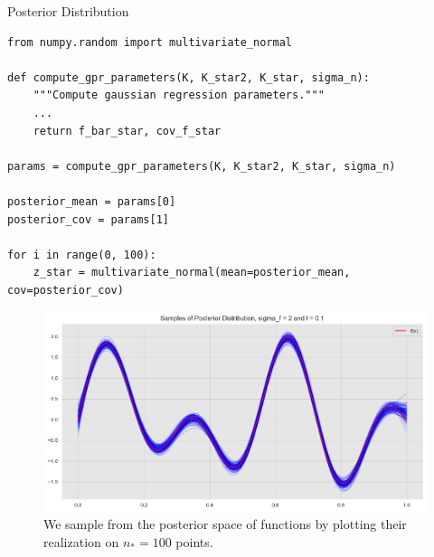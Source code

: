 \documentclass[10pt]{beamer}
\begin{document}
\begin{frame}[fragile]{Posterior Distribution}
\begin{lstlisting}
from numpy.random import multivariate_normal

def compute_gpr_parameters(K, K_star2, K_star, sigma_n):
    """Compute gaussian regression parameters."""
    ...
    return f_bar_star, cov_f_star

params = compute_gpr_parameters(K, K_star2, K_star, sigma_n)

posterior_mean = params[0]
posterior_cov = params[1]

for i in range(0, 100):
    z_star = multivariate_normal(mean=posterior_mean, cov=posterior_cov)
\end{lstlisting}
\begin{center}
\begin{figure}
\includegraphics[scale=0.23]{images/gaussian_process_regression_files/gaussian_process_regression_57_0.png} 
\caption{We sample from the posterior space of functions by plotting their realization on $n_*=100$ points. }
\end{figure}
\end{center}
\end{frame}
\end{document}
